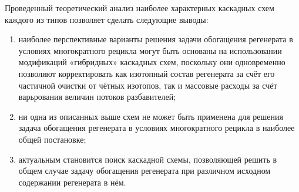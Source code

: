 Проведенный теоретический анализ наиболее характерных каскадных схем каждого из типов позволяет сделать следующие выводы:
\begin{enumerate}
  \item наиболее перспективные варианты решения задачи обогащения регенерата в условиях многократного рецикла могут быть основаны на использовании модификаций «гибридных» каскадных схем, поскольку они одновременно позволяют корректировать как изотопный состав регенерата за счёт его частичной очистки от чётных изотопов, так и массовые расходы за счёт варьрования величин потоков разбавителей;
  \item ни одна из описанных выше схем не может быть применена для решения задача обогащения регенерата в условиях многократного рецикла в наиболее общей постановке;
  \item актуальным становится поиск каскадной схемы, позволяющей решить в общем случае задачу обогащения регенерата при различном исходном содержании регенерата в нём.
\end{enumerate}
